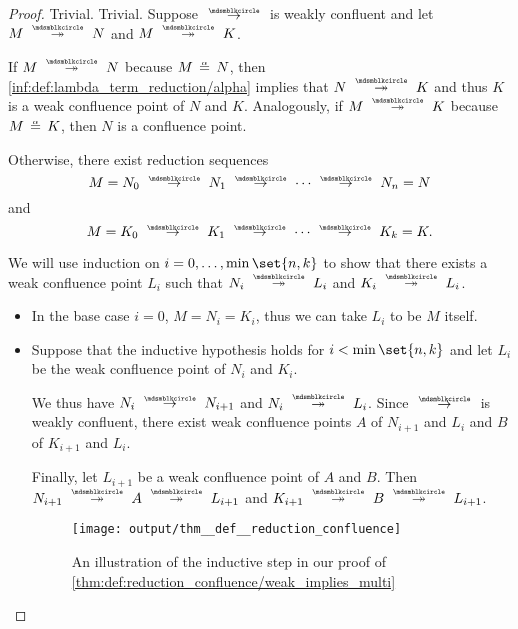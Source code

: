 \begin{proof}
   Trivial.
   Trivial.
   Suppose \( {\pred} \) is weakly confluent and let \( M \pred* N \) and \( M \pred* K \).

  If \( M \pred* N \) because \( M \aequiv N \), then \ref{inf:def:lambda_term_reduction/alpha} implies that \( N \pred* K \) and thus \( K \) is a weak confluence point of \( N \) and \( K \). Analogously, if \( M \pred* K \) because \( M \aequiv K \), then \( N \) is a confluence point.

  Otherwise, there exist reduction sequences
  \begin{equation*}
    M = N_0 \pred N_1 \pred \cdots \pred N_n = N
  \end{equation*}
  and
  \begin{equation*}
    M = K_0 \pred K_1 \pred \cdots \pred K_k = K.
  \end{equation*}

  We will use induction on \( i = 0, \ldots, \min\set{ n, k } \) to show that there exists a weak confluence point \( L_i \) such that \( N_i \pred* L_i \) and \( K_i \pred* L_i \).

  \begin{itemize}
    \item In the base case \( i = 0 \), \( M = N_i = K_i \), thus we can take \( L_i \) to be \( M \) itself.

    \item Suppose that the inductive hypothesis holds for \( i < \min\set{ n, k } \) and let \( L_i \) be the weak confluence point of \( N_i \) and \( K_i \).

    We thus have \( N_i \pred N_{i+1} \) and \( N_i \pred* L_i \). Since \( {\pred} \) is weakly confluent, there exist weak confluence points \( A \) of \( N_{i+1} \) and \( L_i \) and \( B \) of \( K_{i+1} \) and \( L_i \).

    Finally, let \( L_{i+1} \) be a weak confluence point of \( A \) and \( B \). Then \( N_{i+1} \pred* A \pred* L_{i+1} \) and \( K_{i+1} \pred* B \pred* L_{i+1} \).

    \begin{figure}[!ht]
      \centering
      \texttt{[image: output/thm\_\_def\_\_reduction\_confluence]}
      \caption{An illustration of the inductive step in our proof of \cref{thm:def:reduction_confluence/weak_implies_multi}}\label{fig:thm:confluence_of_reflexive_transitive_closure}
    \end{figure}
  \end{itemize}


\end{proof}
